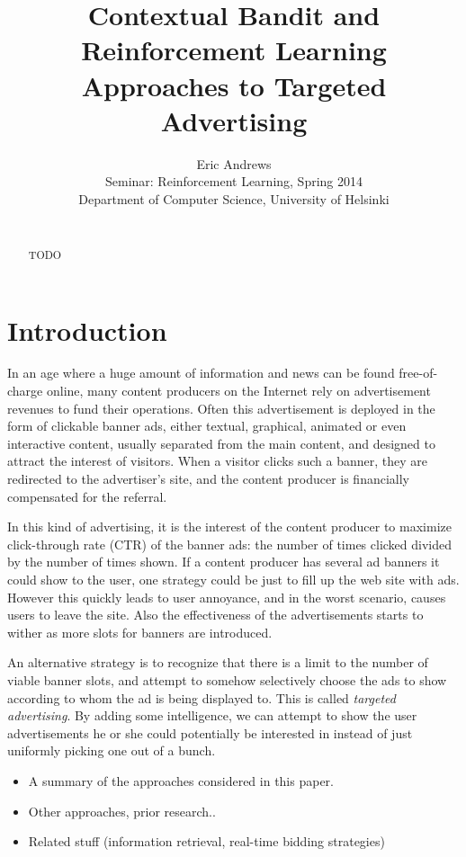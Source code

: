 \documentclass{article} %
\title{Contextual Bandit and Reinforcement Learning Approaches to Targeted
Advertising}
\author{
Eric Andrews \\
Seminar: Reinforcement Learning, Spring 2014 \\
Department of Computer Science, University of Helsinki\\\\
}
\begin{document}
\maketitle

\begin{abstract}
  TODO
\end{abstract}

\section{Introduction}

In an age where a huge amount of information and news can be found
free-of-charge online, many content producers on the Internet rely on
advertisement revenues to fund their operations. Often this advertisement is
deployed in the form of clickable banner ads, either textual, graphical,
animated or even interactive content, usually separated from the main content,
and designed to attract the interest of visitors. When a visitor clicks such a
banner, they are redirected to the advertiser's site, and the content producer
is financially compensated for the referral.

In this kind of advertising, it is the interest of the content producer to
maximize click-through rate (CTR) of the banner ads: the number of times
clicked divided by the number of times shown. If a content producer has several
ad banners it could show to the user, one strategy could be just to fill up the
web site with ads. However this quickly leads to user annoyance, and in the
worst scenario, causes users to leave the site. Also the effectiveness of the
advertisements starts to wither as more slots for banners are introduced.

An alternative strategy is to recognize that there is a limit to the number of
viable banner slots, and attempt to somehow selectively choose the ads to show
according to whom the ad is being displayed to. This is called \emph{targeted
advertising}. By adding some intelligence, we can attempt to show the user
advertisements he or she could potentially be interested in instead of just
uniformly picking one out of a bunch.




\begin{itemize}
  \item
  A summary of the approaches considered in this paper.
  \item
  Other approaches, prior research..
  \item
  Related stuff (information retrieval, real-time bidding strategies)
\end{itemize}
\end{document}
